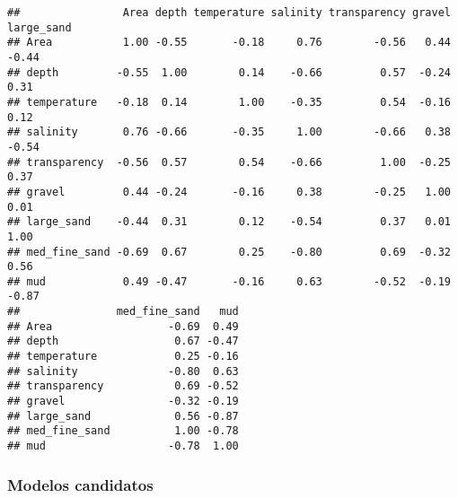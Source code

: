 \documentclass[
]{book}
\begin{document}
\begin{verbatim}
##                Area depth temperature salinity transparency gravel large_sand
## Area           1.00 -0.55       -0.18     0.76        -0.56   0.44      -0.44
## depth         -0.55  1.00        0.14    -0.66         0.57  -0.24       0.31
## temperature   -0.18  0.14        1.00    -0.35         0.54  -0.16       0.12
## salinity       0.76 -0.66       -0.35     1.00        -0.66   0.38      -0.54
## transparency  -0.56  0.57        0.54    -0.66         1.00  -0.25       0.37
## gravel         0.44 -0.24       -0.16     0.38        -0.25   1.00       0.01
## large_sand    -0.44  0.31        0.12    -0.54         0.37   0.01       1.00
## med_fine_sand -0.69  0.67        0.25    -0.80         0.69  -0.32       0.56
## mud            0.49 -0.47       -0.16     0.63        -0.52  -0.19      -0.87
##               med_fine_sand   mud
## Area                  -0.69  0.49
## depth                  0.67 -0.47
## temperature            0.25 -0.16
## salinity              -0.80  0.63
## transparency           0.69 -0.52
## gravel                -0.32 -0.19
## large_sand             0.56 -0.87
## med_fine_sand          1.00 -0.78
## mud                   -0.78  1.00
\end{verbatim}

\hypertarget{modelos-candidatos}{%
\subsubsection{Modelos candidatos}\label{modelos-candidatos}}
\end{document}
